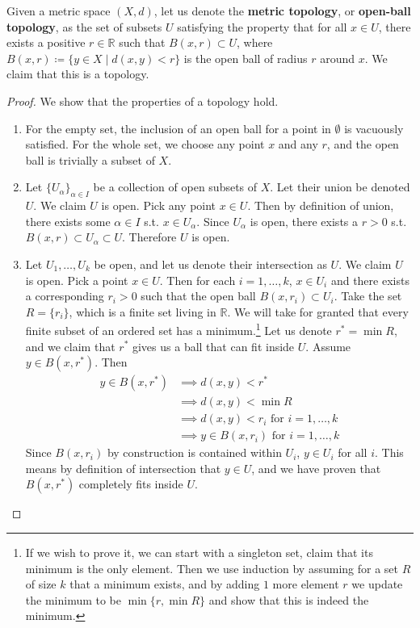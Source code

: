     \begin{theorem}
      Given a metric space $(X, d)$, let us denote the \textbf{metric topology}, or \textbf{open-ball topology}, as the set of subsets $U$ satisfying the property that for all $x \in U$, there exists a positive $r \in \mathbb{R}$ such that $B(x, r) \subset U$, where $B(x, r) \coloneqq \{y \in X \mid d(x, y) < r\}$ is the open ball of radius $r$ around $x$. We claim that this is a topology. 
    \end{theorem} 
    \begin{proof}
      We show that the properties of a topology hold. 
      \begin{enumerate} 
        \item For the empty set, the inclusion of an open ball for a point in $\emptyset$ is vacuously satisfied. For the whole set, we choose any point $x$ and any $r$, and the open ball is trivially a subset of $X$. 

        \item Let $\{U_\alpha\}_{\alpha \in I}$ be a collection of open subsets of $X$. Let their union be denoted $U$. We claim $U$ is open. Pick any point $x \in U$. Then by definition of union, there exists some $\alpha \in I$ s.t. $x \in U_\alpha$. Since $U_\alpha$ is open, there exists a $r > 0$ s.t. $B(x, r) \subset U_\alpha \subset U$. Therefore $U$ is open. 

        \item Let $U_1, \ldots, U_k$ be open, and let us denote their intersection as $U$. We claim $U$ is open. Pick a point $x \in U$. Then for each $i = 1, \ldots, k$, $x \in U_i$ and there exists a corresponding $r_i > 0$  such that the open ball $B(x, r_i) \subset U_i$. Take the set $R = \{r_i\}$, which is a finite set living in $\mathbb{R}$. We will take for granted that every finite subset of an ordered set has a minimum.\footnote{If we wish to prove it, we can start with a singleton set, claim that its minimum is the only element. Then we use induction by assuming for a set $R$ of size $k$ that a minimum exists, and by adding $1$ more element $r$ we update the minimum to be $\min\{r, \min{R}\}$ and show that this is indeed the minimum.} Let us denote $r^\ast = \min{R}$, and we claim that $r^\ast$ gives us a ball that can fit inside $U$. Assume $y \in B(x, r^\ast)$. Then 
        \begin{align}
          y \in B(x, r^\ast) & \implies d(x, y) < r^\ast \\ 
                             & \implies d(x, y) < \min{R} \\
                             & \implies d(x, y) < r_i \text{ for } i = 1, \ldots, k \\
                             & \implies y \in B(x, r_i) \text{ for } i = 1, \ldots, k
        \end{align} 
        Since $B(x, r_i)$ by construction is contained within $U_i$, $y \in U_i$ for all $i$. This means by definition of intersection that $y \in U$, and we have proven that $B(x, r^\ast)$ completely fits inside $U$. 
      \end{enumerate}
    \end{proof} 

